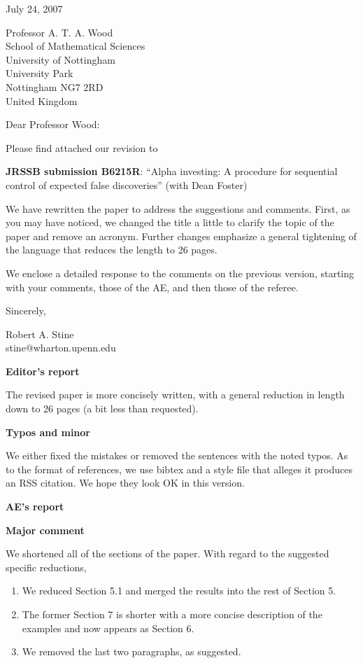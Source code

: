 \documentclass[12pt]{letter}
\begin{document}
\noindent
July 24, 2007

\vspace{0.3in}

\noindent
Professor A. T. A. Wood\\
School of Mathematical Sciences \\
University of Nottingham \\
University Park \\
Nottingham NG7 2RD \\  
United Kingdom

\vspace{0.3in}

\noindent
Dear Professor Wood: 

\noindent
Please find attached our revision to

\noindent
{\bf JRSSB submission B6215R}: ``Alpha investing: A procedure for sequential control of expected false discoveries'' (with Dean Foster)

\noindent
We have rewritten the paper to address the suggestions and comments.  First, as you may have noticed, we changed the title a little to clarify the topic of the paper and remove an acronym. Further changes emphasize a general tightening of the language that reduces the length to 26 pages.

We enclose a detailed response to the comments on the previous version,
starting with your comments, those of the AE, and then those of the referee.

\vspace{0.3in}
\noindent
Sincerely,
\vspace{0.3in}

\noindent
Robert A. Stine  \\
stine@wharton.upenn.edu



\newpage
\centerline{\bf Editor's report}

The revised paper is more concisely written, with a general reduction in length down to 26 pages (a bit less than requested).

{\bf Typos and minor}

We either fixed the mistakes or removed the sentences with the noted typos. As to the format of references, we use bibtex and a style file that alleges it produces an RSS citation.  We hope they look OK in this version.


\newpage
\centerline{\bf AE's report}

{\bf Major comment}

We shortened all of the sections of the paper. With regard to the suggested specific reductions,
\begin{enumerate}
 \item We reduced Section 5.1 and merged the results into the rest of Section 5.
 \item The former Section 7 is shorter with a more concise description of the examples 
          and now appears as Section 6.
 \item We removed the last two paragraphs, as suggested.
\end{enumerate}
\end{document}
